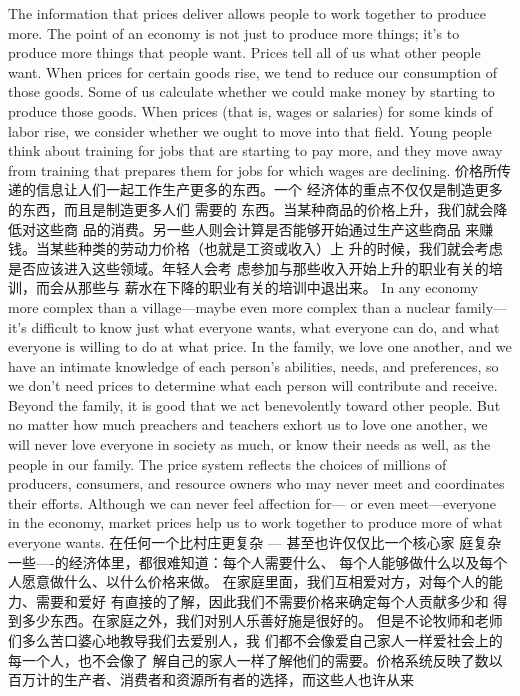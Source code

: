 \begin{paracol}{2}
The information that prices deliver allows people to work together to produce more. The point of an economy is not just to
produce more things; it's to produce more things that people
want. Prices tell all of us what other people want. When prices
for certain goods rise, we tend to reduce our consumption of
those goods. Some of us calculate whether we could make
money by starting to produce those goods. When prices (that
is, wages or salaries) for some kinds of labor rise, we consider
whether we ought to move into that field. Young people think
about training for jobs that are starting to pay more, and they
move away from training that prepares them for jobs for which
wages are declining.
\switchcolumn
价格所传递的信息让人们一起工作生产更多的东西。一个
经济体的重点不仅仅是制造更多的东西，而且是制造更多人们
需要的 东西。当某种商品的价格上升，我们就会降低对这些商
品的消费。另一些人则会计算是否能够开始通过生产这些商品
来赚钱。当某些种类的劳动力价格（也就是工资或收入）上
升的时候，我们就会考虑是否应该进入这些领域。年轻人会考
虑参加与那些收入开始上升的职业有关的培训，而会从那些与
薪水在下降的职业有关的培训中退出来。
\switchcolumn*
In any economy more complex than a village---maybe even
more complex than a nuclear family---it's difficult to know just
what everyone wants, what everyone can do, and what everyone is willing to do at what price. In the family, we love one another, and we have an intimate knowledge of each person's
abilities, needs, and preferences, so we don't need prices to determine what each person will contribute and receive. Beyond
the family, it is good that we act benevolently toward other people. But no matter how much preachers and teachers exhort us
to love one another, we will never love everyone in society as
much, or know their needs as well, as the people in our family.
The price system reflects the choices of millions of producers,
consumers, and resource owners who may never meet and coordinates their efforts. Although we can never feel affection for---
or even meet---everyone in the economy, market prices help us
to work together to produce more of what everyone wants.
\switchcolumn
在任何一个比村庄更复杂 --- 甚至也许仅仅比一个核心家
庭复杂一些----的经济体里，都很难知道：每个人需要什么、
每个人能够做什么以及每个人愿意做什么、以什么价格来做。
在家庭里面，我们互相爱对方，对每个人的能力、需要和爱好
有直接的了解，因此我们不需要价格来确定每个人贡献多少和
得到多少东西。在家庭之外，我们对别人乐善好施是很好的。
但是不论牧师和老师们多么苦口婆心地教导我们去爱别人，我
们都不会像爱自己家人一样爱社会上的每一个人，也不会像了
解自己的家人一样了解他们的需要。价格系统反映了数以百万计的生产者、消费者和资源所有者的选择，而这些人也许从来

\end{paracol}

